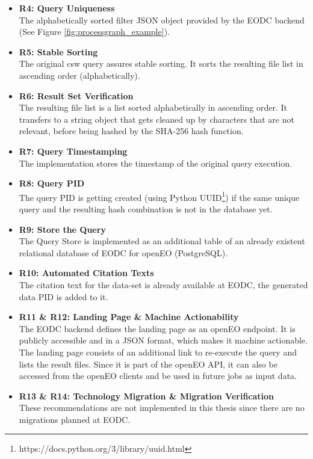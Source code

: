 \documentclass[draft,final]{vutinfth} %
\begin{document}
\begin{itemize}
\begin{itemize}
	\end{itemize}
	\item \textbf{R4: Query Uniqueness} \\
	The alphabetically sorted filter JSON object provided by the EODC backend (See Figure \ref{fig:processgraph_example}).
	\item \textbf{R5: Stable Sorting} \\
	The original \acrshort{csw} query assures stable sorting. It sorts the resulting file list in ascending order (alphabetically).
	\item \textbf{R6: Result Set Verification} \\
	The resulting file list is a list sorted alphabetically in ascending order. It transfers to a string object that gets cleaned up by characters that are not relevant, before being hashed by the SHA-256 hash function. 
	\item \textbf{R7: Query Timestamping} \\
	The implementation stores the timestamp of the original query execution. 
	\item \textbf{R8: Query PID}\\
	The query PID is getting created (using Python UUID\footnote{https://docs.python.org/3/library/uuid.html}) if the same unique query and the resulting hash combination is not in the database yet.
	\item \textbf{R9: Store the Query} \\
	The Query Store is implemented as an additional table of an already existent relational database of EODC for openEO (PostgreSQL). 
	\item \textbf{R10: Automated Citation Texts} \\
	The citation text for the data-set is already available at EODC, the generated data PID is added to it. 
	\item \textbf{R11 \& R12: Landing Page \& Machine Actionability} \\
	The EODC backend defines the landing page as an openEO endpoint. It is publicly accessible and in a JSON format, which makes it machine actionable. The landing page consists of an additional link to re-execute the query and lists the result files. Since it is part of the openEO API, it can also be accessed from the openEO clients and be used in future jobs as input data.
	\item \textbf{R13 \& R14: Technology Migration \& Migration Verification} \\
	These recommendations are not implemented in this thesis since there are no migrations planned at EODC.
\end{itemize}
\end{document}
